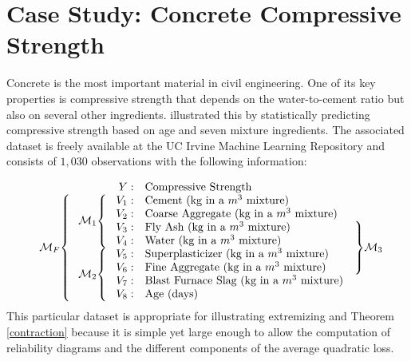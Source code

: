 \documentclass[11pt]{article}
\theoremstyle{definition}
\theoremstyle{definition}
\begin{document}
%
%
%
%
%


\section{Case Study: Concrete Compressive Strength} \label{application}

Concrete is the most important material in civil engineering. One of its key properties is compressive strength that depends on the water-to-cement ratio but also on several other ingredients. \cite{yeh1998modeling} illustrated this by statistically predicting compressive strength based on age and seven mixture ingredients. The associated dataset is freely available at the UC Irvine Machine Learning Repository \citep{Lichman:2013} and consists of $1,030$ observations with the following information:

\begin{equation}
\begin{array}{ll r lr}
&&Y: & \text{Compressive Strength}&\\
\ldelim\{{8}{2.5em}[$\mathcal{M}_F$] &\ldelim\{{4}{2.5em}[$\mathcal{M}_1$] &V_1: &  \text{Cement (kg in a $m^3$ mixture)}&  \\
&&V_2: & \text{Coarse Aggregate (kg in a $m^3$ mixture)}&\\
  &&V_3: &  \text{Fly Ash (kg in a $m^3$ mixture)}&  \rdelim\}{4}{2em}[$\mathcal{M}_3$] \\
&&V_4: & \text{Water (kg in a $m^3$ mixture)}&\\
&\ldelim\{{4}{2.5em}[$\mathcal{M}_2$] &V_5: &  \text{Superplasticizer (kg in a $m^3$ mixture)}&  \\
&&V_6: & \text{Fine Aggregate  (kg in a $m^3$ mixture)}&\\
&&V_7: & \text{Blast Furnace Slag (kg in a $m^3$ mixture)}&\\
&&V_8: & \text{Age (days)}&
\end{array}\label{realData}
\end{equation}
\noindent
This particular dataset is appropriate for illustrating extremizing and Theorem \ref{contraction} because it is simple yet large enough to allow the computation of reliability diagrams and the different components of the average quadratic loss.
\end{document}
